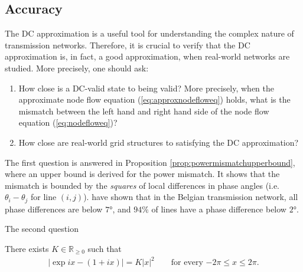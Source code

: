 \documentclass[main.tex]{subfiles}
\begin{document}
\subsection{Accuracy}
The DC approximation is a useful tool for understanding the complex nature of transmission networks. Therefore, it is crucial to verify that the DC approximation is, in fact, a good approximation, when real-world networks are studied. More precisely, one should ask:
\begin{enumerate}
    \item How close is a DC-valid state to being valid? More precisely, when the approximate node flow equation (\ref{eq:approxnodefloweq}) holds, what is the mismatch between the left hand and right hand side of the node flow equation (\ref{eq:nodefloweq})?
    \item How close are real-world grid structures to satisfying the DC approximation?
\end{enumerate}

The first question is answered in Proposition \ref{prop:powermismatchupperbound}, where an upper bound is derived for the power mismatch. It shows that the mismatch is bounded by the \emph{squares} of local differences in phase angles (i.e. $\theta_i - \theta_j$ for line $(i,j)$). \citet{Purchala} have shown that in the Belgian transmission network, all phase differences are below $7 \si{\degree}$, and $94\si{\percent}$ of lines have a phase difference below $2\si{\degree}$.

The second question  


\begin{lemma}\label{lem:expaprrox}
There exists $K \in \mathbb{R}_{\geq 0}$ such that
\begin{align*}
    |\exp ix - (1 + ix)| = K |x|^2 \qquad \text{for every $-2\pi \leq x \leq 2\pi$}.
\end{align*}
\end{lemma}
\end{document}
